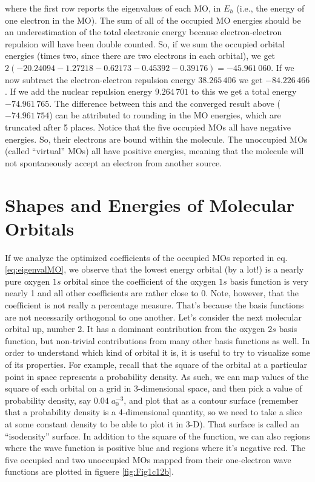 \documentclass[
  9pt,
]{extbook}
\theoremstyle{definition}
\theoremstyle{definition}
\theoremstyle{definition}
\theoremstyle{remark}
\begin{document}
where the first row reports the eigenvalues of each MO, in \(E_h\) (i.e., the energy of one electron in the MO). The sum of all of the occupied MO energies should be an underestimation of the total electronic energy because electron-electron repulsion will have been double counted. So, if we sum the occupied orbital energies (times two, since there are two electrons in each orbital), we get \(2(-20.24094{-}1.27218{-}0.62173{-}0.45392{-}0.39176)=-45.961\,060\). If we now subtract the electron-electron repulsion energy \(38.265\,406\) we get \(-84.226\,466\). If we add the nuclear repulsion energy \(9.264\,701\) to this we get a total energy \(-74.961\,765\). The difference between this and the converged result above (\(-74.961\,754\)) can be attributed to rounding in the MO energies, which are truncated after 5 places. Notice that the five occupied MOs all have negative energies. So, their electrons are bound within the molecule. The unoccupied MOs (called ``virtual'' MOs) all have positive energies, meaning that the molecule will not spontaneously accept an electron from another source.

\hypertarget{shapes-and-energies-of-molecular-orbitals}{%
\section{Shapes and Energies of Molecular Orbitals}\label{shapes-and-energies-of-molecular-orbitals}}

If we analyze the optimized coefficients of the occupied MOs reported in eq. \eqref{eq:eigenvalMO}, we observe that the lowest energy orbital (by a lot!) is a nearly pure oxygen \(1s\) orbital since the coefficient of the oxygen \(1s\) basis function is very nearly 1 and all other coefficients are rather close to 0. Note, however, that the coefficient is not really a percentage measure. That's because the basis functions are not necessarily orthogonal to one another. Let's consider the next molecular orbital up, number 2. It has a dominant contribution from the oxygen \(2s\) basis function, but non-trivial contributions from many other basis functions as well. In order to understand which kind of orbital it is, it is useful to try to visualize some of its properties. For example, recall that the square of the orbital at a particular point in space represents a probability density. As such, we can map values of the square of each orbital on a grid in 3-dimensional space, and then pick a value of probability density, say \(0.04\; a_0^{-3}\), and plot that as a contour surface (remember that a probability density is a 4-dimensional quantity, so we need to take a slice at some constant density to be able to plot it in 3-D). That surface is called an ``isodensity'' surface. In addition to the square of the function, we can also regions where the wave function is positive blue and regions where it's negative red. The five occupied and two unoccupied MOs mapped from their one-electron wave functions are plotted in figuere \ref{fig:Fig1c12b}.
\end{document}
